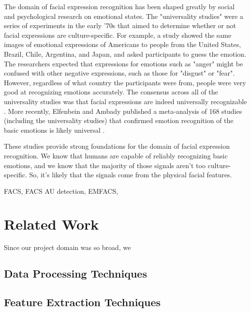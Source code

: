 \documentclass[10pt,twocolumn,letterpaper]{article}
\begin{document}
The domain of facial expression recognition has been shaped greatly by social and psychological research on emotional states. The "universality studies" were a series of experiments in the early '70s that aimed to determine whether or not facial expressions are culture-specific. For example, a study showed the same images of emotional expressions of Americans to people from the United States, Brazil, Chile, Argentina, and Japan, and asked participants to guess the emotion. The researchers expected that expressions for emotions such as "anger" might be confused with other negative expressions, such as those for "disgust" or "fear". However, regardless of what country the participants were from, people were very good at recognizing emotions accurately. The consensus across all of the universality studies was that facial expressions are indeed universally recognizable \cite{universality_studies}. More recently, Elfenbein and Ambady published a meta-analysis of 168 studies (including the universality studies) that confirmed emotion recognition of the basic emotions is likely universal \cite{universality}.

These studies provide strong foundations for the domain of facial expression recognition. We know that humans are capable of reliably recognizing basic emotions, and we know that the majority of those signals aren't too culture-specific. So, it's likely that the signals come from the physical facial features.

FACS, FACS AU detection, EMFACS, 


\section{Related Work} 
Since our project domain was so broad, we 


\subsection{Data Processing Techniques}

\subsection{Feature Extraction Techniques}

\end{document}
